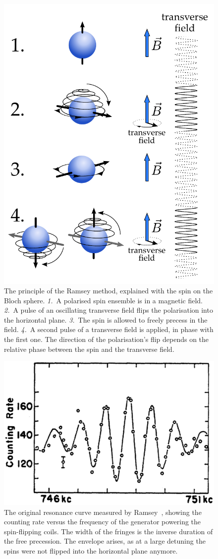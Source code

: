 \begin{figure}
  \centering
  \includegraphics[width=.6\linewidth]{gfx/nEDMatPSI/ramsey.pdf}
  \caption{The principle of the Ramsey method, explained with the spin on the Bloch sphere. \emph{1.}~A polarised spin ensemble is in a magnetic field. \emph{2.}~A pulse of an oscillating transverse field flips the polarisation into the horizontal plane. \emph{3.}~The spin is allowed to freely precess in the field. \emph{4.}~A second pulse of a transverse field is applied, in phase with the first one. The direction of the polarisation's flip depends on the relative phase between the spin and the transverse field.}\label{fig:nEDM_Ramsey_principle}
\end{figure}

\begin{figure}
  \centering
  \includegraphics[width=.6\linewidth]{gfx/introduction/Ramsey_original_resonance.png}
  \caption{The original resonance curve measured by Ramsey~\cite{PhysRev.108.120}, showing the counting rate versus the frequency of the generator powering the spin-flipping coils.
  The width of the fringes is the inverse duration of the free precession. The envelope arises, as at a large detuning the spins were not flipped into the horizontal plane anymore.}\label{fig:nEDM_Ramsey_original_curve}
\end{figure}

